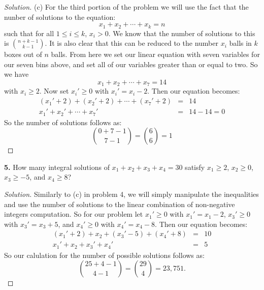 \documentclass[12pt]{amsart}
\newenvironment{solution}
{\begin{proof}[Solution]}
{\end{proof}}
\begin{document}
\begin{onehalfspace}
\begin{solution}
            (c) For the third portion of the problem we will use the fact that the nunber of solutions to the equation:
            \begin{displaymath}
                x_1 + x_2 + \cdots + x_k = n
            \end{displaymath}
            such that for all $1\le i \le k$, $x_i > 0$. We know that the number of solutions to this is $\binom{n+k-1}{k-1}$. It
            is also clear that this can be reduced to the number $x_i$ balls in $k$ boxes out of $n$ balls. From here
            we set our linear equation with seven variables for our seven bins above, and set all of our variables
            greater than or equal to two. So we have
            \begin{displaymath}
                x_1 + x_2 + \cdots + x_7  = 14
            \end{displaymath}
            with $x_i \ge 2$. Now set $x_i' \ge 0 $ with $x_i' = x_i - 2$. Then our equation becomes:
            \begin{eqnarray*}
                (x_1' + 2) + (x_2' + 2) + \cdots + (x_7' + 2)  & = & 14 \\
                x_1' + x_2' + \cdots + x_7'  & = & 14 - 14 = 0
            \end{eqnarray*}
            So the number of solutions follows as:
            \begin{displaymath}
                \binom{0 + 7 - 1}{7-1} = \binom{6}{6} = 1
            \end{displaymath}
        \end{solution}

        \textbf{5.} How many integral solutions of $x_1 + x_2 + x_3 + x_4 = 30$ satisfy
        $x_1\ge 2$, $x_2\ge 0$, $x_3\ge -5$, and $x_4\ge 8$?
        \begin{solution}
            Similarly to (c) in problem 4, we will simply manipulate the inequalities and use the number of solutions
            to the linear combination of non-negative integers computation. So for our problem let $x_1' \ge 0$ with
            $x_1' = x_1 - 2$, $x_3' \ge 0$ with $x_3' = x_3 + 5$, and $x_4' \ge 0$ with $x_4'=x_4 - 8$. Then our equation
            becomes:
            \begin{eqnarray*}
                (x_1'+ 2) + x_2 + (x_3' - 5) + (x_4' + 8) & = & 10 \\
                x_1' + x_2 + x_3' + x_4' & = & 5
            \end{eqnarray*}
            So our calulation for the number of possible solutions follows as:
            \begin{displaymath}
                \binom{25+ 4 - 1}{4 - 1} = \binom{29}{4} = 23,751.
            \end{displaymath}
        \end{solution}


\end{onehalfspace}
\end{document}
